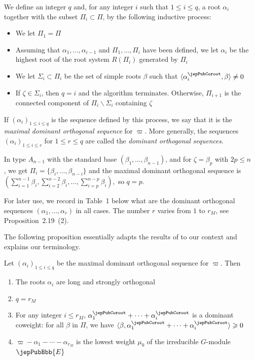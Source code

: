 We define an integer $q$ and, for any integer $i$ such that $1\leqslant i\leqslant q$, a root $\alpha_i$ together with the subset $\Pi_i\subset\Pi$, by the following inductive process:
\begin{itemize}
\item We let $\Pi_1=\Pi$
\item Assuming that $\alpha_1,\ldots,\alpha_{i-1}$ and $\Pi_1,\ldots,\Pi_i$ have been defined, we let $\alpha_i$ be the highest root of the root system $R(\Pi_i)$ generated by $\Pi_i$
\item We let $\Sigma_i\subset\Pi_i$ be the set of simple roots $\beta$ such that $\langle\alpha_i^\jepPubCoroot,\beta\rangle\neq0$
\item If $\zeta\in\Sigma_i$, then $q=i$ and the algorithm terminates. Otherwise, $\Pi_{i+1}$ is the connected component of $\Pi_i\smallsetminus\Sigma_i$ containing $\zeta$
\end{itemize}
\begin{definition}
If $(\alpha_i)_{1\leqslant i\leqslant q}$ is the sequence defined by this process, we say that it is the \emph{maximal dominant orthogonal sequence} for $\varpi$. More generally, the sequences $(\alpha_i)_{1\leqslant i\leqslant r}$ for $1\leqslant r\leqslant q$ are called the \emph{dominant orthogonal sequences}.
\end{definition}
\begin{example}
In type $A_{n-1}$ with the standard base $(\beta_1,\ldots,\beta_{n-1})$, and for $\zeta=\beta_p$ with $2p\leqslant n$, we get $\Pi_i=\{\beta_i,\ldots,\beta_{n-i}\}$ and the maximal dominant orthogonal sequence is $(\sum_{i=1}^{n-1}\beta_i,\sum_{i=2}^{n-2}\beta_i,\ldots,\sum_{i=p}^{n-p}\beta_i),$ so $q=p$.
\end{example}
For later use, we record in Table~1 below what are the dominant orthogonal sequences $(\alpha_1,\ldots,\alpha_r)$ in all cases. The number $r$ varies from $1$ to $r_M$, see Proposition~2.19~(2).

The following proposition essentially adapts the results of \cite{jep93Kos12} to our context and explains our terminology.
\begin{proposition}
Let $(\alpha_i)_{1\leqslant i\leqslant q}$ be the maximal dominant orthogonal sequence for $\varpi$. Then
\begin{enumerate}[label=(\arabic*)]
\item The roots $\alpha_i$ are long and strongly orthogonal
\item $q=r_M$
\item For any integer $i\leqslant r_M$, $\alpha_1^\jepPubCoroot+\cdots+\alpha_i^\jepPubCoroot$ is a dominant coweight: for all $\beta$ in $\Pi$, we have $\langle\beta,\alpha_1^\jepPubCoroot+\cdots+\alpha_i^\jepPubCoroot\rangle\geqslant0$
\item $\varpi-\alpha_1-\cdots-\alpha_{r_M}$ is the lowest weight $\mu_0$ of the irreducible $G$-module $\jepPubBbb{E}$
\end{enumerate}
\end{proposition}


